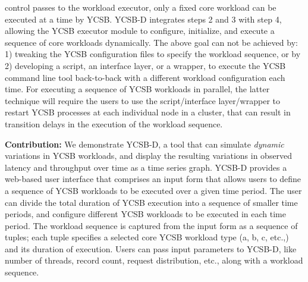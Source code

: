 \documentclass[conference]{IEEEtran}
\begin{document}
                control passes to the workload executor, only a fixed core workload can be executed at
                a time by YCSB.
                 YCSB-D integrates steps 2 and 3 with step 4, allowing the
                 YCSB executor module to configure, initialize, and execute a sequence of core workloads dynamically.
                 The above goal can not be achieved by: 1) tweaking the YCSB configuration files
                to specify the workload sequence, or by 2) developing a script, an interface layer, or a wrapper, to
                 execute the YCSB command line tool back-to-back with a different workload configuration each time. For
                 executing a sequence of YCSB workloads in parallel, the latter technique will require the users to
                 use the script/interface layer/wrapper to restart YCSB processes at each individual node in a cluster, that can result in
                 transition delays in the execution of the workload sequence.
            \par \textbf{Contribution:} We demonstrate  YCSB-D, a tool that can simulate \emph{dynamic} variations in YCSB workloads, and display the resulting variations in observed latency and throughput over time as a time series graph. YCSB-D provides a web-based user interface that comprises an input form that allows users to define a sequence of  YCSB workloads to be executed over a given time period. The user can divide the total duration of YCSB execution into a sequence of smaller time periods, and configure different YCSB workloads to be executed in each time period. The workload sequence is captured from the input form as a sequence of tuples; each tuple specifies a selected core YCSB workload type (a, b, c, etc.,) and its duration of execution. Users can  pass input parameters to YCSB-D, like number of threads, record count, request distribution, etc., along with a workload sequence.
\end{document}
